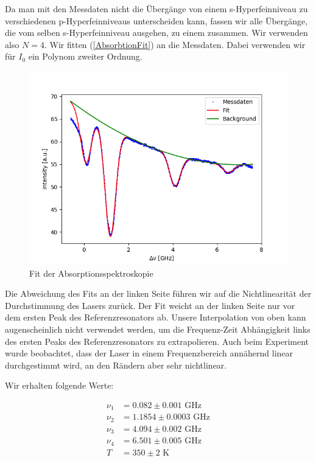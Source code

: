\documentclass[a4paper,parskip]{scrartcl}
\begin{document}
Da man mit den Messdaten nicht die Übergänge von einem s-Hyperfeinniveau zu verschiedenen p-Hyperfeinniveaus unterscheiden kann, fassen wir alle Übergänge, die vom selben s-Hyperfeinniveau ausgehen, zu einem zusammen. Wir verwenden also $N=4$. Wir fitten (\ref{AbsorbtionFit}) an die Messdaten. Dabei verwenden wir für $I_0$ ein Polynom zweiter Ordnung.

\begin{figure}[h]
\centering
\includegraphics[scale = 0.5]{./absorbtion/fit.png}
\caption{Fit der Absorptionsspektroskopie}
\end{figure}

Die Abweichung des Fits an der linken Seite führen wir auf die Nichtlinearität der Durchstimmung des Lasers zurück. Der Fit weicht an der linken Seite nur vor dem ersten Peak des Referenzresonators ab. Unsere Interpolation von oben kann augenscheinlich nicht verwendet werden, um die Frequenz-Zeit Abhängigkeit links des ersten Peaks des Referenzresonators zu extrapolieren. Auch beim Experiment wurde beobachtet, dass der Laser in einem Frequenzbereich annähernd linear durchgestimmt wird, an den Rändern aber sehr nichtlinear.

Wir erhalten folgende Werte:

\begin{align*}
\nu_1 &= 0.082 \pm 0.001 \text{ GHz} \\
\nu_2 &= 1.1854 \pm 0.0003 \text{ GHz}\\
\nu_3 &= 4.094 \pm 0.002 \text{ GHz}\\
\nu_4 &= 6.501 \pm 0.005 \text{ GHz}\\
T&=350 \pm 2 \text{ K}
\end{align*}
\end{document}
